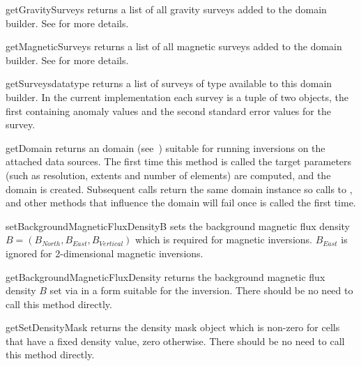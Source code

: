 \begin{methoddesc}[DomainBuilder]{getGravitySurveys}{}
returns a list of all gravity surveys added to the domain builder. See
 for more details.
\end{methoddesc}

\begin{methoddesc}[DomainBuilder]{getMagneticSurveys}{}
returns a list of all magnetic surveys added to the domain builder. See
 for more details.
\end{methoddesc}

\begin{methoddesc}[DomainBuilder]{getSurveys}{datatype}
returns a list of surveys of type  available to this domain
builder. In the current implementation each survey is a tuple of two \Data
objects, the first containing anomaly values and the second standard error
values for the survey.
\end{methoddesc}

\begin{methoddesc}[DomainBuilder]{getDomain}{}
returns an \escript domain (see~\cite{ESCRIPT}) suitable for running inversions
on the attached data sources.
The first time this method is called the target parameters (such as resolution,
extents and number of elements) are computed, and the domain is created.
Subsequent calls return the same domain instance so calls to
,  and other methods that influence
the domain will fail once  is called the first time.
\end{methoddesc}

\begin{methoddesc}[DomainBuilder]{setBackgroundMagneticFluxDensity}{B}
sets the background magnetic flux density $B=(B_{North},B_{East},B_{Vertical})$
which is required for magnetic inversions.
$B_{East}$ is ignored for 2-dimensional magnetic inversions.
\end{methoddesc}

\begin{methoddesc}[DomainBuilder]{getBackgroundMagneticFluxDensity}{}
returns the background magnetic flux density $B$ set via
 in a form suitable for the inversion.
There should be no need to call this method directly.
\end{methoddesc}

\begin{methoddesc}[DomainBuilder]{getSetDensityMask}{}
returns the density mask \Data object which is non-zero for cells that have a
fixed density value, zero otherwise.
There should be no need to call this method directly.
\end{methoddesc}

